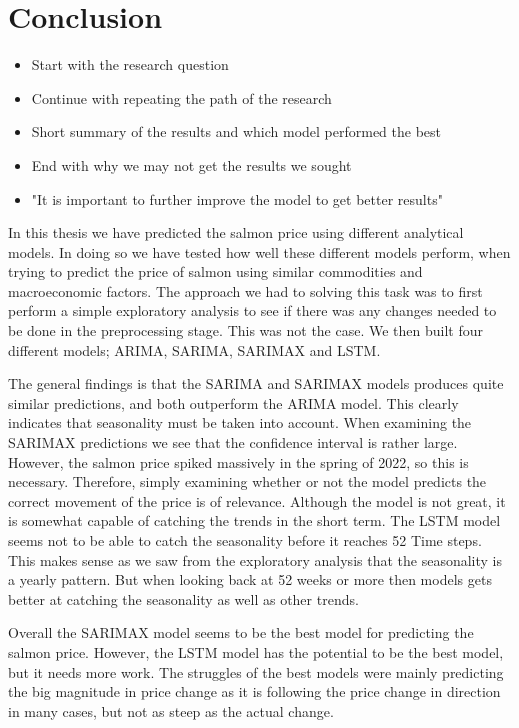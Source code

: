 \section{Conclusion}
\begin{itemize}
    \item Start with the research question
    \item Continue with repeating the path of the research
    \item Short summary of the results and which model performed the best
    \item End with why we may not get the results we sought
    \item "It is important to further improve the model to get better results"
\end{itemize}

In this thesis we have predicted the salmon price using different analytical models. In doing so we have tested how well these different models perform, when trying to predict the price of salmon using similar commodities and macroeconomic factors. The approach we had to solving this task was to first perform a simple exploratory analysis to see if there was any changes needed to be done in the preprocessing stage. This was not the case. We then built four different models; ARIMA, SARIMA, SARIMAX and LSTM.

The general findings is that the SARIMA and SARIMAX models produces quite similar predictions, and both outperform the ARIMA model. This clearly indicates that seasonality must be taken into account. When examining the SARIMAX predictions we see that the confidence interval is rather large. However, the salmon price spiked massively in the spring of 2022, so this is necessary. Therefore, simply examining whether or not the model predicts the correct movement of the price is of relevance. Although the model is not great, it is somewhat capable of catching the trends in the short term. The LSTM model seems not to be able to catch the seasonality before it reaches 52 Time steps. This makes sense as we saw from the exploratory analysis that the seasonality is a yearly pattern. But when looking back at 52 weeks or more then models gets better at catching the seasonality as well as other trends.

Overall the SARIMAX model seems to be the best model for predicting the salmon price. However, the LSTM model has the potential to be the best model, but it needs more work. The struggles of the best models were mainly predicting the big magnitude in price change as it is following the price change in direction in many cases, but not as steep as the actual change.

